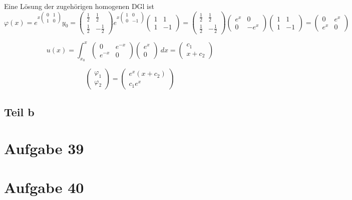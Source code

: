 \documentclass[10pt,a4paper]{article}
\begin{document}
Eine Lösung der zugehörigen homogenen DGl ist
\begin{equation}
\varphi(x) = e^{x\begin{pmatrix}
0 & 1\\
1 & 0
\end{pmatrix}
} y_{0} = \begin{pmatrix}
\frac{1}{2} & \frac{1}{2}\\
\frac{1}{2} & -\frac{1}{2}
\end{pmatrix}
e^{x \begin{pmatrix}
1 & 0\\
0 & -1
\end{pmatrix}
}
\begin{pmatrix}
1 & 1\\
1 & -1
\end{pmatrix}
= \begin{pmatrix}
\frac{1}{2} & \frac{1}{2}\\
\frac{1}{2} & -\frac{1}{2}
\end{pmatrix}
\begin{pmatrix}
e^{x} & 0\\
0 & -e^{x}
\end{pmatrix}
\begin{pmatrix}
1 & 1\\
1 & -1
\end{pmatrix}
= \begin{pmatrix}
0 & e^{x}\\
e^{x} & 0
\end{pmatrix}
\end{equation}

\begin{equation}
u(x) = \int_{x_{0}}^{x} 
\begin{pmatrix}
0 & e^{-x}\\
e^{-x} & 0
\end{pmatrix}
\begin{pmatrix}
e^{x}\\0
\end{pmatrix}\ dx
= \begin{pmatrix}
c_{1}\\x + c_{2}
\end{pmatrix}
\end{equation}

\begin{equation}
\begin{pmatrix}
\varphi_{1}\\
\varphi_{2}
\end{pmatrix}
= \begin{pmatrix}
e^{x}(x + c_{2})\\
c_{1}e^{x}
\end{pmatrix}
\end{equation}

\subsection*{Teil b}

\section*{Aufgabe 39}

\section*{Aufgabe 40}
\end{document}
